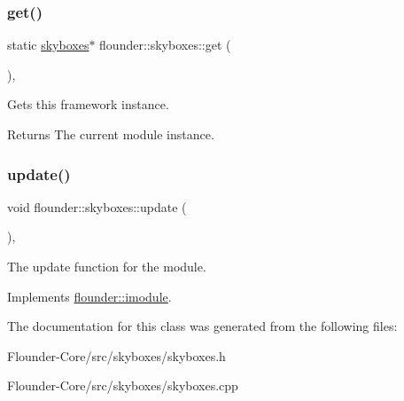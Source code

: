 \subsubsection{\texorpdfstring{get()}{get()}}
{\footnotesize\ttfamily static \hyperlink{classflounder_1_1skyboxes}{skyboxes}$\ast$ flounder\+::skyboxes\+::get (\begin{DoxyParamCaption}{ }\end{DoxyParamCaption})\hspace{0.3cm}{\ttfamily [inline]}, {\ttfamily [static]}}



Gets this framework instance. 

\begin{DoxyReturn}{Returns}
The current module instance. 
\end{DoxyReturn}
\mbox{\label{classflounder_1_1skyboxes_ae94e675bcda78f2af0298a8551b82aa6}} 
\subsubsection{\texorpdfstring{update()}{update()}}
{\footnotesize\ttfamily void flounder\+::skyboxes\+::update (\begin{DoxyParamCaption}{ }\end{DoxyParamCaption})\hspace{0.3cm}{\ttfamily [override]}, {\ttfamily [virtual]}}



The update function for the module. 



Implements \hyperlink{classflounder_1_1imodule_a9a53d48a46b5f6b16a92b2cd8503f74a}{flounder\+::imodule}.



The documentation for this class was generated from the following files\+:\begin{DoxyCompactItemize}
\item 
Flounder-\/\+Core/src/skyboxes/skyboxes.\+h\item 
Flounder-\/\+Core/src/skyboxes/skyboxes.\+cpp\end{DoxyCompactItemize}
